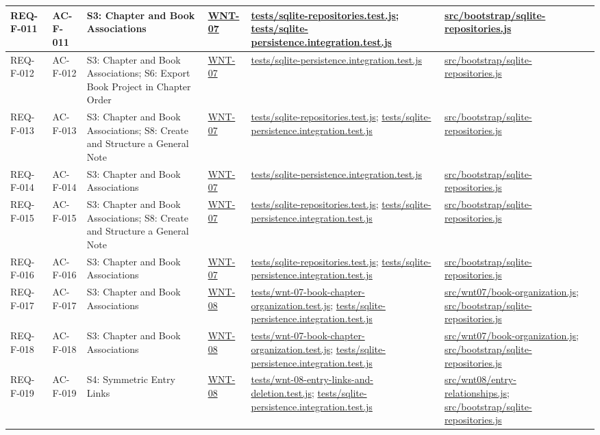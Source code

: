 \documentclass[10pt,a4paper]{article}
\renewcommand{\texttt}[1]{\url{#1}}
\begin{document}
\begin{longtable}{|L{2.5cm}|L{2.6cm}|L{4.4cm}|L{3.3cm}|L{3.3cm}|L{3.3cm}|L{3.3cm}|}
REQ-F-011 & AC-F-011 & S3: Chapter and Book Associations & \texttt{WNT-07} & \texttt{tests/sqlite-repositories.test.js}; \texttt{tests/sqlite-persistence.integration.test.js} & \texttt{src/bootstrap/sqlite-repositories.js} & \\ \hline
REQ-F-012 & AC-F-012 & S3: Chapter and Book Associations; S6: Export Book Project in Chapter Order & \texttt{WNT-07} & \texttt{tests/sqlite-persistence.integration.test.js} & \texttt{src/bootstrap/sqlite-repositories.js} & \\ \hline
REQ-F-013 & AC-F-013 & S3: Chapter and Book Associations; S8: Create and Structure a General Note & \texttt{WNT-07} & \texttt{tests/sqlite-repositories.test.js}; \texttt{tests/sqlite-persistence.integration.test.js} & \texttt{src/bootstrap/sqlite-repositories.js} & \\ \hline
REQ-F-014 & AC-F-014 & S3: Chapter and Book Associations & \texttt{WNT-07} & \texttt{tests/sqlite-persistence.integration.test.js} & \texttt{src/bootstrap/sqlite-repositories.js} & \\ \hline
REQ-F-015 & AC-F-015 & S3: Chapter and Book Associations; S8: Create and Structure a General Note & \texttt{WNT-07} & \texttt{tests/sqlite-repositories.test.js}; \texttt{tests/sqlite-persistence.integration.test.js} & \texttt{src/bootstrap/sqlite-repositories.js} & \\ \hline
REQ-F-016 & AC-F-016 & S3: Chapter and Book Associations & \texttt{WNT-07} & \texttt{tests/sqlite-repositories.test.js}; \texttt{tests/sqlite-persistence.integration.test.js} & \texttt{src/bootstrap/sqlite-repositories.js} & \\ \hline
REQ-F-017 & AC-F-017 & S3: Chapter and Book Associations & \texttt{WNT-08} & \texttt{tests/wnt-07-book-chapter-organization.test.js}; \texttt{tests/sqlite-persistence.integration.test.js} & \texttt{src/wnt07/book-organization.js}; \texttt{src/bootstrap/sqlite-repositories.js} & \\ \hline
REQ-F-018 & AC-F-018 & S3: Chapter and Book Associations & \texttt{WNT-08} & \texttt{tests/wnt-07-book-chapter-organization.test.js}; \texttt{tests/sqlite-persistence.integration.test.js} & \texttt{src/wnt07/book-organization.js}; \texttt{src/bootstrap/sqlite-repositories.js} & \\ \hline
REQ-F-019 & AC-F-019 & S4: Symmetric Entry Links & \texttt{WNT-08} & \texttt{tests/wnt-08-entry-links-and-deletion.test.js}; \texttt{tests/sqlite-persistence.integration.test.js} & \texttt{src/wnt08/entry-relationships.js}; \texttt{src/bootstrap/sqlite-repositories.js} & \\ \hline

\end{longtable}
\end{document}
